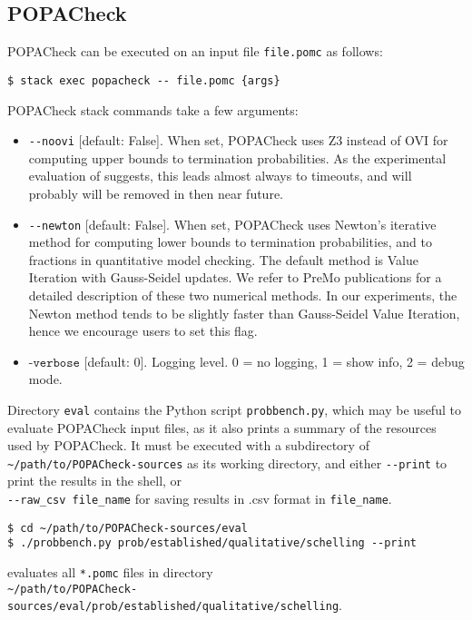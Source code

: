 \documentclass[9pt,a4paper]{article}
\begin{document}
\subsection{POPACheck}

POPACheck can be executed on an input file \verb|file.pomc| as follows:
\begin{verbatim}
$ stack exec popacheck -- file.pomc {args}
\end{verbatim}

POPACheck stack commands take a few arguments:
\begin{itemize}
    \item \verb|--noovi| [default: False]. When set, POPACheck uses Z3 instead of OVI for computing upper bounds to termination probabilities. As the experimental evaluation of \cite{POPACheck} suggests, this leads almost always to timeouts, and will probably will be removed in then near future.
    \item \verb|--newton| [default: False]. When set, POPACheck uses Newton's iterative method for computing lower bounds to termination probabilities, and to fractions in quantitative model checking. The default method is Value Iteration with Gauss-Seidel updates. We refer to PreMo publications \cite{WojtczakE07,Wojtczak09} for a detailed description of these two numerical methods. In our experiments, the Newton method tends to be slightly faster than Gauss-Seidel Value Iteration, hence we encourage users to set this flag.
    \item $\texttt{-verbose}$ [default: 0]. Logging level. 0 = no logging, 1 = show info, 2 = debug mode.
\end{itemize}

Directory \verb|eval| contains the Python script \verb|probbench.py|,
which may be useful to evaluate POPACheck input files, as it also prints
a summary of the resources used by POPACheck.
It must be executed with a subdirectory of \verb|~/path/to/POPACheck-sources| as its working directory, and either \verb|--print| to print the results in the shell, or \\ \verb|--raw_csv file_name| for saving results in .csv format in \verb|file_name|.

\begin{verbatim}
$ cd ~/path/to/POPACheck-sources/eval
$ ./probbench.py prob/established/qualitative/schelling --print
\end{verbatim}
evaluates all \verb|*.pomc| files in directory \\ \verb|~/path/to/POPACheck-sources/eval/prob/established/qualitative/schelling|.
\end{document}
